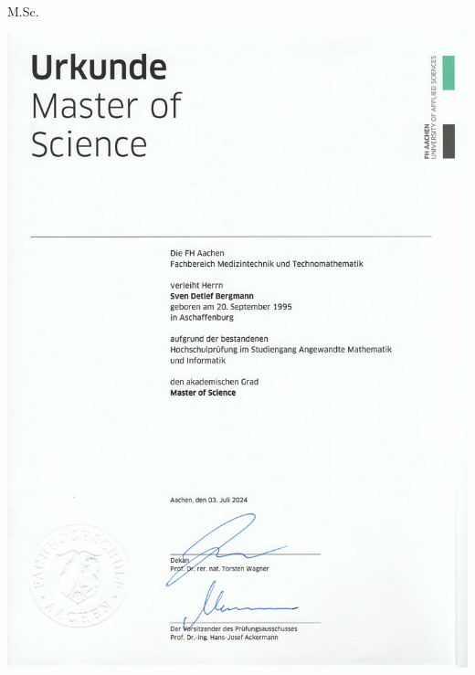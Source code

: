 \section{\appendixtrans}\label{sec:appendix}

\certificate{} M.Sc. \fhac
\vfill
\begin{center}
    \includegraphics[scale=0.65]{include/certificates/Masterurkunde}
\end{center}
\vfill

\pagebreak

